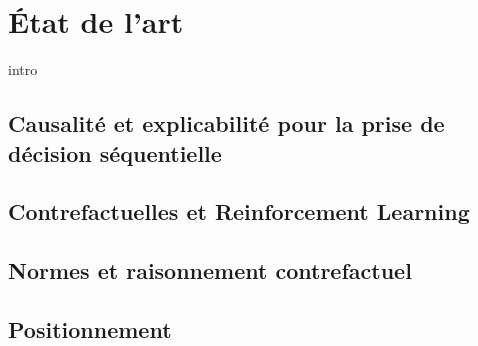 \section{État de l'art}
intro
\subsection{Causalité et explicabilité pour la prise de décision séquentielle}
\textcite{pearl2009causality}
\subsection{Contrefactuelles et Reinforcement Learning}
\textcite{dong_counterfactual_2025}
\textcite{lally_robust_2026}
\textcite{gajcin2024redefining}

\subsection{Normes et raisonnement contrefactuel}
\textcite{damico_interventionist_nodate}
\textcite{henne_counterfactual_2021}
\textcite{icard_normality_2017}
\textcite{kominsky_causal_2015}
\textcite{mcgill_mutability_2000} 

\subsection{Positionnement}
\textcite{sarmiento_formalising_2025}


\textcite{a}